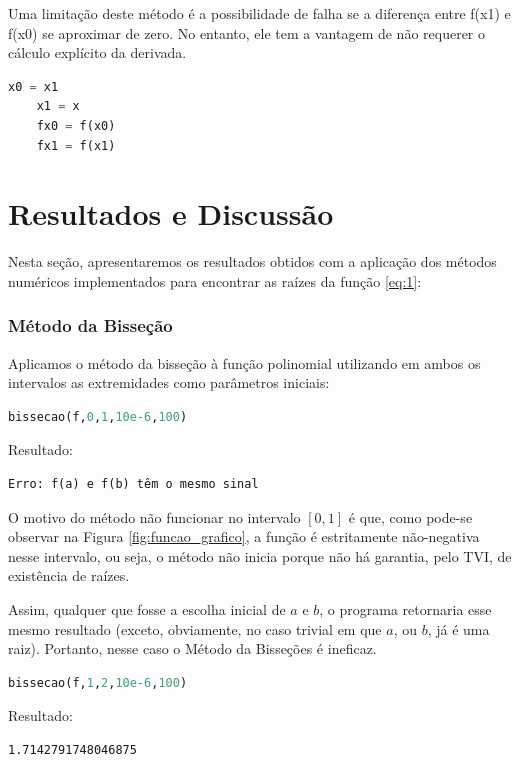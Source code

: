 \documentclass{article}
\begin{document}
Uma limitação deste método é a possibilidade de falha se a diferença entre f(x1) e f(x0) se aproximar de zero. No entanto, ele tem a vantagem de não requerer o cálculo explícito da derivada.
\begin{lstlisting}[language=Python]
    x0 = x1
    x1 = x
    fx0 = f(x0)
    fx1 = f(x1)
\end{lstlisting}


\section{Resultados e Discuss\~{a}o}
Nesta se\c{c}\~{a}o, apresentaremos os resultados obtidos com a aplica\c{c}\~{a}o dos m\'{e}todos num\'{e}ricos implementados para encontrar as ra\'{i}zes da fun\c{c}\~{a}o \eqref{eq:1}:

\subsubsection{Método da Bisseção}
Aplicamos o método da bisseção à função polinomial utilizando em ambos os intervalos as extremidades como parâmetros iniciais:

\begin{lstlisting}[language=Python]
bissecao(f,0,1,10e-6,100)
\end{lstlisting}

Resultado:
\begin{verbatim}
Erro: f(a) e f(b) têm o mesmo sinal
\end{verbatim}


O motivo do método não funcionar no intervalo $[0,1]$ é que, como pode-se observar na Figura \ref{fig:funcao_grafico}, a função é estritamente não-negativa nesse intervalo, ou seja, o método não inicia porque não há garantia, pelo TVI, de existência de raízes.

Assim, qualquer que fosse a escolha inicial de $a$ e $b$, o programa retornaria esse mesmo resultado (exceto, obviamente, no caso trivial em que $a$, ou $b$, já é uma raiz). Portanto, nesse caso o Método da Bisseções é ineficaz.\\

\begin{lstlisting}[language=Python]
bissecao(f,1,2,10e-6,100)
\end{lstlisting}

Resultado:
\begin{verbatim}
1.7142791748046875
\end{verbatim}
\end{document}
